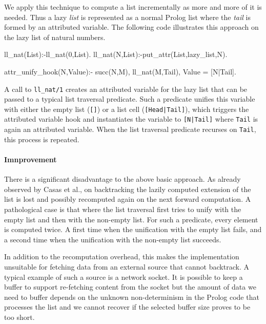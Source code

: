 \documentclass{new_tlp}
\begin{document}
We apply this technique to compute a list incrementally as more
and more of it is needed. Thus a lazy \emph{list} is represented as a normal
Prolog list where the \emph{tail} is formed by an attributed variable. The following
code illustrates this approach on the lazy list of natural numbers.
\begin{code}
ll_nat(List):-ll_nat(0,List). 
ll_nat(N,List):-put_attr(List,lazy_list,N).

attr_unify_hook(N,Value):-
  succ(N,M),
  ll_nat(M,Tail),
  Value = [N|Tail].
\end{code}
A call to \texttt{ll\_nat/1} creates an attributed variable for the lazy list
that can be passed to a typical list traversal predicate.  Such a predicate
unifies this variable with either the empty list (\texttt{[]}) or a list cell
(\texttt{[Head|Tail]}), which triggers the attributed variable hook and
instantiates the variable to {\tt [N|Tail]} where {\tt Tail} is again an
attributed variable. When the list traversal predicate recurses on {\tt Tail},
this process is repeated.

\paragraph{Imnprovement}
There is a significant disadvantage to the above basic approach.  As already
observed by Casas et al., on backtracking the lazily computed extension of the
list is lost and possibly recomputed again on the next forward computation. A
pathological case is that where the list traversal first tries to unify with
the empty list and then with the non-empty list. For such a predicate, every
element is computed twice. A first time when the unification with the empty
list fails, and a second time when the unification with the non-empty list
succeeds.

In addition to the recomputation overhead, this makes the implementation
unsuitable for fetching data from an external source that cannot backtrack. A
typical example of such a source is a network socket. It is possible to keep a
buffer to support re-fetching content from the socket but the amount of data we
need to buffer depends on the unknown non-determinism in the Prolog code that
processes the list and we cannot recover if the selected buffer size proves to
be too short.
\end{document}
